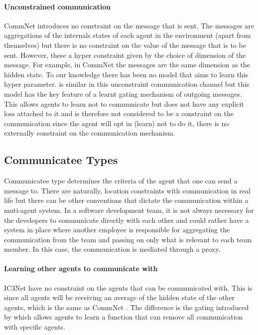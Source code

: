 \documentclass{article}
\begin{document}
\paragraph{Unconstrained communication}
CommNet \citep{sukhbaatar2016commnet} introduces no constraint on the message that is sent. The messages are aggregations of the internals states of each agent in the environment (apart from themselves) but there is no constraint on the value of the message that is to be sent. However, these a hyper constraint given by the choice of dimension of the message. For example, in CommNet the messages are the same dimension as the hidden state. To our knowledge there has been no model that aims to learn this hyper parameter. \citet{singh2018ic3net} is similar in this unconstraint communication channel but this model has the key feature of a learnt gating mechanism of outgoing messages. This allows agents to learn not to communicate but does not have any explicit loss attached to it and is therefore not considered to be a constraint on the communication since the agent will opt in (learn) not to do it, there is no externally constraint on the communication mechanism.

\subsection{Communicatee Types}

Communicatee type determines the criteria of the agent that one can send a message to. There are naturally, location constraints with communication in real life but there can be other conventions that dictate the communication within a muti-agent system. In a software development team, it is not always necessary for the developers to communicate directly with each other and could rather have a system in place where another employee is responsible for aggregating the communication from the team and passing on only what is relevant to each team member. In this case, the communication is mediated through a proxy.

\paragraph{Learning other agents to communicate with} IC3Net \citep{singh2018ic3net} have no constraint on the agents that can be communicated with. This is since all agents will be receiving an average of the hidden state of the other agents, which is the same as CommNet \citep{sukhbaatar2016commnet}. The difference is the gating introduced by \citet{singh2018ic3net} which allows agents to learn a function that can remove all communication with specific agents. 
\end{document}
